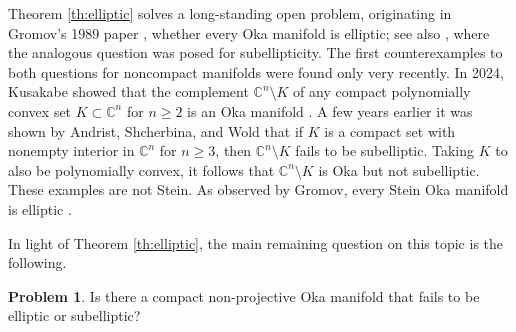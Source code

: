 \documentclass[12pt]{amsart}
\theoremstyle{definition}
\newtheorem{problem}[theorem]{Problem}
\numberwithin{equation}{section}
\numberwithin{figure}{section}
\newcommand\C{\mathbb{C}}
\numberwithin{equation}{section}
\begin{document}
Theorem \ref{th:elliptic} solves a long-standing open problem, 
originating in Gromov's 1989 paper \cite[3.2.A" Question]{Gromov1989},  
whether every Oka manifold is elliptic;
see also \cite[Problem 6.4.21]{Forstneric2017E},
where the analogous question was posed for subellipticity.
The first counterexamples to both questions for noncompact manifolds
were found only very recently. 
In 2024, Kusakabe showed that the complement
$\C^n\setminus K$ of any compact polynomially convex set 
$K\subset\C^n$ for $n\geq 2$ is an Oka manifold
\cite[Theorem 1.6]{Kusakabe2024AM}. 
A few years earlier it was shown by 
Andrist, Shcherbina, and Wold \cite{AndristShcherbinaWold2016}
that if $K$ is a compact set with nonempty interior
in $\C^n$ for $n\ge 3$, then $\C^n\setminus K$ 
fails to be subelliptic.
Taking $K$ to also be polynomially convex, it follows that 
$\C^n\setminus K$ is Oka but not subelliptic.
These examples are not Stein.  As observed by Gromov, every Stein 
Oka manifold is elliptic \cite[3.2.A, p.\ 879]{Gromov1989}. 

In light of Theorem \ref{th:elliptic}, the main remaining
question on this topic is the following.

\begin{problem}
Is there a compact non-projective Oka manifold that fails
to be elliptic or subelliptic?
\end{problem}
\end{document}
